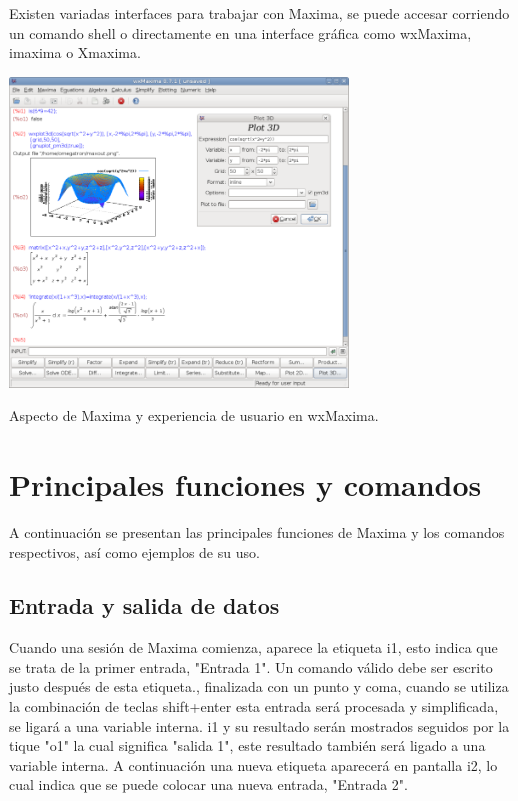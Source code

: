 \documentclass{article} %
\begin{document}
\vspace{0.5 cm}

Existen variadas interfaces para trabajar con Maxima, se puede accesar corriendo un comando shell o directamente en una interface gráfica como wxMaxima, imaxima o Xmaxima. 

\begin{center}

	\includegraphics[width=9cm]{WxMaxima.png}
    
    Aspecto de Maxima y experiencia de usuario en wxMaxima.
    
\end{center}

\section{Principales funciones y comandos}

A continuación se presentan las principales funciones de Maxima y los comandos respectivos, así como ejemplos de su uso. 

\subsection{Entrada y salida de datos}

Cuando una sesión de Maxima comienza, aparece la etiqueta i1, esto indica que se trata de la primer entrada, "Entrada 1". Un comando válido debe ser escrito justo después de esta etiqueta., finalizada con un punto y coma, cuando se utiliza la combinación de teclas shift+enter esta entrada será procesada y simplificada, se ligará a una variable interna. i1 y su resultado serán mostrados seguidos por la tique "o1" la cual significa "salida 1", este resultado también será ligado a una variable interna. A continuación una nueva etiqueta aparecerá en pantalla i2, lo cual indica que se puede colocar una nueva entrada, "Entrada 2". 
\end{document}
